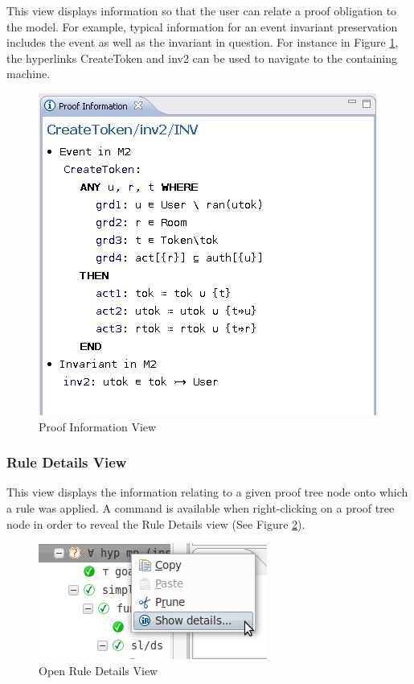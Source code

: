 This view displays information so that the user can relate a proof obligation to the model. For example, typical information for an event invariant preservation includes the event as well as the invariant in question. For instance in Figure \ref{fig_ref_01_proving_perspective8}, the hyperlinks \textsf{CreateToken} and \textsf{inv2} can be used to navigate to the containing machine. 

\begin{figure}[!ht]
\begin{center}
	\includegraphics{img/reference/ref_01_proving_perspective8.png}
	\caption{Proof Information View}
	\label{fig_ref_01_proving_perspective8}
\end{center}
\end{figure}

\subsubsection{Rule Details View}

This view displays the information relating to a given proof tree node onto which a rule was applied.
A command is available when right-clicking on a proof tree node in order to reveal the \textsf{Rule Details} view (See Figure \ref{fig_ref_01_proving_perspective9}).

\begin{figure}[!ht]
\begin{center}
	\includegraphics{img/reference/ref_01_proving_perspective9.png}
	\caption{Open Rule Details View}
	\label{fig_ref_01_proving_perspective9}
\end{center}
\end{figure}

